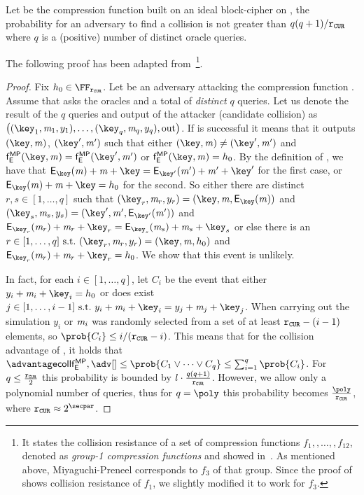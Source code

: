 \begin{lemma}\label{lemma:colrescomp}
    Let \fMP{} be the \MP{} compression function built on an ideal block-cipher \Enc{} on \FFx{\rCURVE}, the probability for an adversary \adv{} to find a collision is not greater than $q(q+1)/\mathtt{r_{CUR}}$ where $q$ is a (positive) number of distinct oracle queries.
\end{lemma}

The following proof has been adapted from~\cite[Lemma 3.3]{black2002black}\footnote{It states the collision resistance of a set of compression functions $f_1,,\ldots,,f_{12}$, denoted as \emph{group-1 compression functions} and showed in~\cite[Figure 3]{black2002black}. As mentioned above, Miyaguchi-Preneel corresponds to $f_3$ of that group. Since the proof of~\cite[Lemma 3.3]{black2002black} shows collision resistance of $f_1$, we slightly modified it to work for $f_3$.}.

\begin{proof}
    Fix $h_0\in\FFx{\rCURVE}$. Let \adv{} be an adversary attacking the compression function \fMP{}.
    Assume that \adv{} asks the oracles \oracleEnc{} and \oracleDec{} a total of \emph{distinct} $q$ queries. Let us denote the result of the $q$ queries and output of the attacker (candidate collision) as $\left ( (\key_1, \msg_1, y_1), \ldots , (\key_q, \msg_q, y_q), \text{out} \right )$.
    If \adv{} is successful it means that it outputs $(\key, \msg)$, $(\key', \msg')$ such that either $(\key, \msg) \neq (\key', \msg')$ and $\fMP(\key, \msg) = \fMP(\key', \msg')$ or $\fMP(\key, \msg) = h_0$.
    By the definition of \fMP, we have that $\Enc_\key(\msg) + \msg + \key = \Enc_{\key'}(\msg') + \msg' + \key'$ for the first case, or $\Enc_\key(\msg) + \msg + \key = h_0$ for the second.
    So either there are distinct $r, s \in [1,\ldots, q]$ such that $(\key_r, \msg_r, y_r) = (\key, \msg, \Enc_\key(\msg))$ and $(\key_s,\msg_s, y_s) = (\key',\msg', \Enc_{\key'}(\msg'))$ and $\Enc_{\key_r}(\msg_r) + \msg_r + \key_r = \Enc_{\key_s}(\msg_s) + \msg_s + \key_s$ or else there is an $r \in [1,\ldots, q]\ \suchthat\ (\key_r, \msg_r, y_r) = (\key, \msg, h_0)$ and $\Enc_{\key_r}(\msg_r) + \msg_r + \key_r = h_0$. We show that this event is unlikely.

    In fact, for each $i \in [1,\ldots, q]$, let $C_i$ be the event that either $y_i + \msg_i + \key_i = h_0$ or does exist $j \in [1,\ldots, i-1]\ \suchthat\ y_i + \msg_i + \key_i = y_j + \msg_j + \key_j$. When carrying out the simulation $y_i$ or $\mathit{m}_i$ was randomly selected from a set of at least $\mathtt{r_{CUR}} - (i-1)$ elements, so $\prob{C_i}\leq i / (\rCURVE-i)$. This means that for the collision advantage of \adv{}, \advCollMP it holds that $\advCollMP \leq \prob{C_1 \lor \cdots \lor C_q} \leq \sum_{i=1}^{q} \prob{C_i}$. For $q \leq \frac{\mathtt{r_{CUR}}}{2}$ this probability is bounded by $l \cdot \frac{q(q+1)}{\mathtt{r_{CUR}}}$. However, we allow only a polynomial number of queries, thus for $q = \poly$ this probability becomes $\frac{\poly}{\rCURVE}$, where $\rCURVE \approx 2^\secpar$.
\end{proof}

